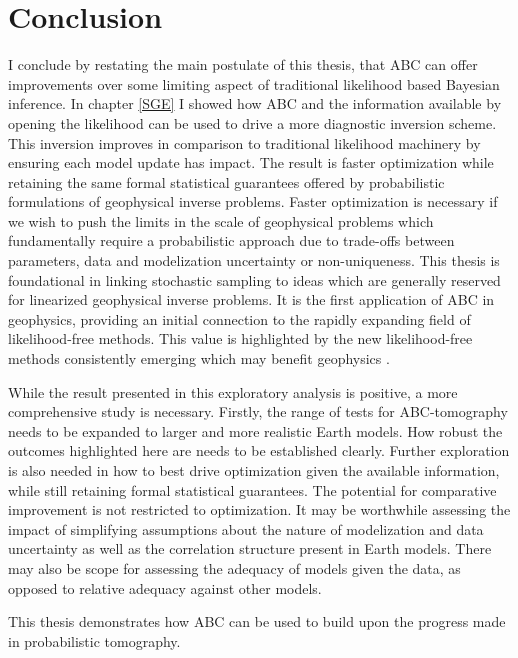 

\chapter{Conclusion}

I conclude by restating the main postulate of this thesis, that ABC can offer improvements over some limiting aspect of traditional likelihood based Bayesian inference. In chapter \ref{SGE} I showed how ABC and the information available by opening the likelihood can be used to drive a more diagnostic inversion scheme. This inversion improves in comparison to traditional likelihood machinery by ensuring each model update has impact. The result is faster optimization while retaining the same formal statistical guarantees offered by probabilistic formulations of geophysical inverse problems.  Faster optimization is necessary if we wish to push the limits in the scale of geophysical problems which fundamentally require a probabilistic approach due to trade-offs between parameters, data and modelization uncertainty or non-uniqueness. This thesis is foundational in linking stochastic sampling to ideas which are generally reserved for linearized geophysical inverse problems. It is the first application of ABC in geophysics, providing an initial connection to the rapidly expanding field of likelihood-free methods. This value is highlighted by the new likelihood-free methods consistently emerging which may benefit geophysics \citep{papamakarios2016fast,song2017nice}.\par

While the result presented in this exploratory analysis is positive, a more comprehensive study is necessary. Firstly, the range of tests for ABC-tomography needs to be expanded to larger and more realistic Earth models. How robust the outcomes highlighted here are needs to be established clearly. Further exploration is also needed in how to best drive optimization given the available information, while still retaining formal statistical guarantees. The potential for comparative improvement is not restricted to optimization. It may be worthwhile assessing the impact of simplifying assumptions about the nature of modelization and data uncertainty as well as the correlation structure present in Earth models. There may also be scope for assessing the adequacy of models given the data, as opposed to relative adequacy against other models. \par
This thesis demonstrates how ABC can be used to build upon the progress made in probabilistic tomography. 
